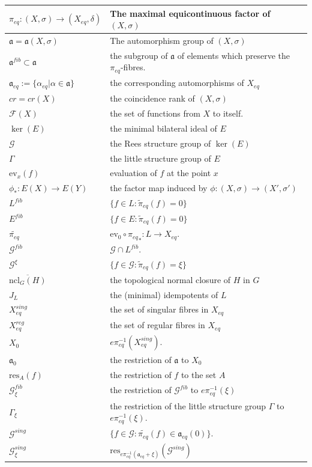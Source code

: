 \documentclass[12pt]{amsart}
\theoremstyle{definition}
\numberwithin{equation}{section}
\newcommand{\Ff}{{\mathcal F}}
\newcommand{\Gg}{{\mathcal G}}
\newcommand{\Xe}{X_{eq}}
\newcommand{\aut}{{\mathfrak a}}
\newcommand{\aute}{\aut_{eq}}
\newcommand{\pe}{\pi_{eq}}
\newcommand{\tpe}{\widetilde{\pe}}
\newcommand{\ev}{\mathrm{ev}}
\newcommand{\res}{\mathrm{res}}
\newcommand{\Gf}{\Gg^{fib}}
\begin{document}
\begin{table}[h]
\begin{tabular}{|l|l|}
\hline
 $\pe:(X,\sigma)\to (\Xe,\delta)$ &  The maximal  equicontinuous factor of $(X,\sigma)$  \\ \hline
 $\aut=\aut(X,\sigma)$ &          The automorphism group of $(X,\sigma)$           \\ \hline
  $\aut^{fib}\subset \aut$ 
& the subgroup of $\aut$ of elements which preserve the $\pe$-fibres. \\ \hline
$\aute:=\{\alpha_{eq}|\alpha\in \aut\}$&  the corresponding automorphisms of $\Xe$  \\ \hline
  $cr=cr(X)$ & the coincidence rank of $(X, \sigma)$  \\ \hline
 $\Ff(X)$  
&  the set of functions from $X$ to itself. \\ \hline
$\ker(E)$ &  the minimal bilateral ideal of $E$  \\ \hline
 $\Gg$ & the Rees structure group of $\ker(E)$ \\ \hline
$\Gamma$ & the little structure group of $E$  \\ \hline
 $\ev_x (f)$
&   evaluation of $f$ at the point $x$ \\ \hline
$\phi_*: E(X) \to E(Y)$  & the factor map induced by  $\phi:(X, \sigma)\to (X',\sigma')$ \\ \hline
 $L^{fib}$ & $\{ f\in L: \widetilde\pe(f)=0\}$  \\ \hline
  $E^{fib} $
& $ \{ f\in E: \widetilde\pe(f)=0\}$      \\ \hline
$\tpe $ &  $\ev_0\circ {\pe}_*:L\to \Xe.$  \\ \hline
 $\Gg^{fib}$ & $\Gg\cap L^{fib}$.  \\ \hline
 $ \Gg^{\xi} $ &   $ \{f\in \Gg: \widetilde\pe (f) = \xi\} $\\ \hline
  $\overline{\text{ncl}_G(H)}$ &  the topological  normal closure of $H$ in $G$  \\ \hline
 $J_L$ & the (minimal) idempotents of $L$ \\ \hline
 $\Xe^{sing}$ &  the set of singular fibres in $\Xe$
  \\ \hline
 $\Xe^{reg}$ &   the set of regular fibres in $\Xe$  \\ \hline
  $X_0$
 & $e\pe^{-1}(\Xe^{sing})$.  \\ \hline
  $\aut_0$ & the restriction of $\aut$ to $X_0$  \\ \hline
 $\res_{A}(f)$ & the restriction of $f$ to the set $A$  \\ \hline
  $\Gf_\xi$ & the restriction of $\Gf$ to $e\pe^{-1}(\xi)$  \\ \hline
  $\Gamma_\xi$ & the restriction of the little structure group $\Gamma$ to $e\pe^{-1}(\xi)$.
  \\ \hline
 $\Gg^{sing}$ &$\{ f\in \Gg: \widetilde{\pe}(f) \in {\mathfrak a}_{eq}(0)\}.$  \\ \hline
  $ \Gg_\xi^{sing} $ & $\res_{e\pe^{-1}  (   {\mathfrak a}_{eq} +\xi      )} (\Gg^{sing}) $  \\ \hline
\end{tabular}
\end{table}
\end{document}
